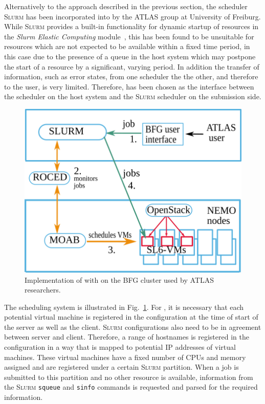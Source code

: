 Alternatively to the approach described in the previous section, the
scheduler \textsc{Slurm} has been incorporated into \Roced by
the ATLAS group at University of Freiburg.
While \textsc{Slurm} provides a built-in functionality for dynamic
startup of resources in the \textit{Slurm Elastic Computing} module~\cite{SlurmElastic}, this has been found to be unsuitable for resources which are not
expected to be available within a fixed time period, in this case due to
the presence of a queue in the host system which may postpone the start
of a resource by a significant, varying period.
In addition the transfer of information, such as error states, from one scheduler the the
other, and therefore to the user, is very limited.
Therefore, \Roced has been chosen as the interface between the
\Moab scheduler on the host system and the \textsc{Slurm}
scheduler on the submission side.


\begin{figure}

\includegraphics[width=0.95\linewidth]{figures/virtualisierung_ROCED.png}
\caption{Implementation of \Roced with \Slurm on the BFG cluster used by ATLAS researchers.}
\label{fig:slurmRocedBFG}
\end{figure}

The scheduling system is illustrated in Fig.~\ref{fig:slurmRocedBFG}.
For \Slurm, it is necessary that each potential virtual
machine is registered in the configuration at the time of start of the
\Slurm server as well as the client. \textsc{Slurm} configurations also
need to be in agreement between server and client.
Therefore, a range of hostnames is registered in the configuration in
a way that is mapped to potential IP addresses of virtual machines.
These virtual machines have a fixed number of CPUs and memory assigned and are
registered under a certain \textsc{Slurm} partition.
When a job is submitted to this partition and no other resource is
available, information from the \textsc{Slurm} \texttt{squeue} and
\texttt{sinfo} commands is requested and parsed for the required information.

